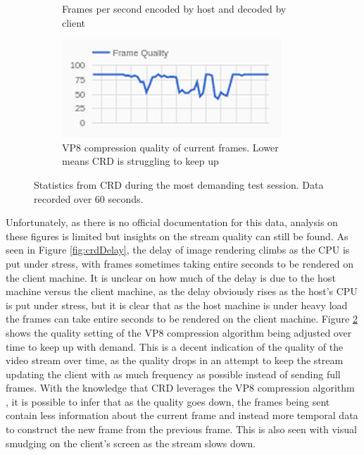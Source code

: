 \begin{figure}[h]
\begin{subfigure}{.33\textwidth}
    \captionsetup{width=.85\linewidth}
    \caption{Frames per second encoded by host and decoded by client}
    \label{fig:crdFPS}
  \end{subfigure}%
  \begin{subfigure}{.33\textwidth}
    \centering
    \includegraphics[width=1\linewidth]{Figures/crd/quality}
    \captionsetup{width=.85\linewidth}
    \caption{VP8 compression quality of current frames. Lower means CRD is struggling to keep up}
    \label{fig:crdQuality}
  \end{subfigure}
  \captionsetup{width=.8\linewidth}
  \caption[CRD Data]{Statistics from CRD during the most demanding test session. Data recorded over 60 seconds.}
  \label{fig:crdStats}
\end{figure}

Unfortunately, as there is no official documentation for this data, analysis on these figures is limited but insights on the stream quality can still be found.
As seen in Figure \ref{fig:crdDelay}, the delay of image rendering climbs as the CPU is put under stress, with frames sometimes taking entire seconds to be rendered on the client machine.
It is unclear on how much of the delay is due to the host machine versus the client machine, as the delay obviously rises as the host's CPU is put under stress, but it is clear that as the host machine is under heavy load the frames can take entire seconds to be rendered on the client machine.
Figure \ref{fig:crdQuality} shows the quality setting of the VP8 compression algorithm being adjusted over time to keep up with demand.
This is a decent indication of the quality of the video stream over time, as the quality drops in an attempt to keep the stream updating the client with as much frequency as possible instead of sending full frames.
With the knowledge that CRD leverages the VP8 compression algorithm \cite{miniorange_chromoting}, it is possible to infer that as the quality goes down, the frames being sent contain less information about the current frame and instead more temporal data to construct the new frame from the previous frame.
This is also seen with visual smudging on the client's screen as the stream slows down.

